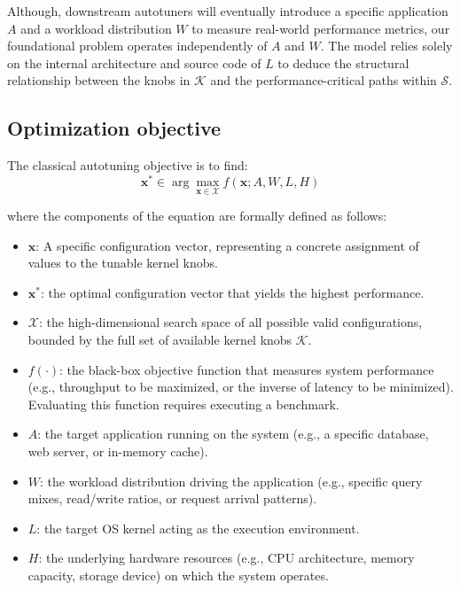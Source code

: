 Although, downstream autotuners will eventually introduce a specific application $A$ and a workload distribution $W$ to measure real-world performance metrics, our foundational problem operates independently of $A$ and $W$.
The model relies solely on the internal architecture and source code of $L$ to deduce the structural relationship between the knobs in $\mathcal{K}$ and the performance-critical paths within $\mathcal{S}$.

\subsection{Optimization objective}\label{sec:problem-objective}

The classical autotuning objective is to find:
\begin{equation}
    \mathbf{x}^* \in \arg\max_{\mathbf{x} \in \mathcal{X}} f(\mathbf{x}; A, W, L, H)
\end{equation}

where the components of the equation are formally defined as follows:
\begin{itemize}
    \item $\mathbf{x}$: A specific configuration vector, representing a concrete assignment of values to the tunable kernel knobs.
    \item $\mathbf{x}^*$: the optimal configuration vector that yields the highest performance.
    \item $\mathcal{X}$: the high-dimensional search space of all possible valid configurations, bounded by the full set of available kernel knobs $\mathcal{K}$.
    \item $f(\cdot)$: the black-box objective function that measures system performance (e.g., throughput to be maximized, or the inverse of latency to be minimized). Evaluating this function requires executing a benchmark.
    \item $A$: the target application running on the system (e.g., a specific database, web server, or in-memory cache).
    \item $W$: the workload distribution driving the application (e.g., specific query mixes, read/write ratios, or request arrival patterns).
    \item $L$: the target OS kernel acting as the execution environment.
    \item $H$: the underlying hardware resources (e.g., CPU architecture, memory capacity, storage device) on which the system operates.
\end{itemize}

